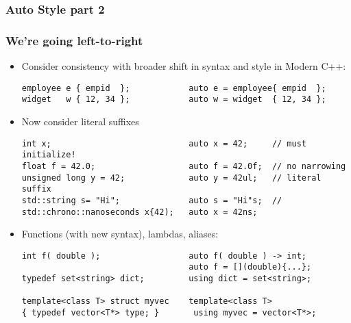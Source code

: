 \begin{frame}[fragile]
\frametitle{Auto Style part 2}
\frametitle{We're going left-to-right}
\begin{itemize}[<+->]
\item Consider consistency with broader shift in syntax and style in
  Modern C++:
{\scriptsize \begin{verbatim}
employee e { empid  };            auto e = employee{ empid  };
widget   w { 12, 34 };            auto w = widget  { 12, 34 };
\end{verbatim} }
\item Now consider literal suffixes
{\scriptsize \begin{verbatim}
int x;                            auto x = 42;     // must initialize!
float f = 42.0;                   auto f = 42.0f;  // no narrowing
unsigned long y = 42;             auto y = 42ul;   // literal suffix
std::string s= "Hi";              auto s = "Hi"s;  //
std::chrono::nanoseconds x{42);   auto x = 42ns;
\end{verbatim} }
\item Functions (with new syntax), lambdas, aliases:
{\scriptsize \begin{verbatim}
int f( double );                  auto f( double ) -> int; 
                                  auto f = [](double){...};
typedef set<string> dict;         using dict = set<string>;

template<class T> struct myvec    template<class T>
{ typedef vector<T*> type; }       using myvec = vector<T*>;
\end{verbatim} }


\end{itemize} %
\end{frame}



